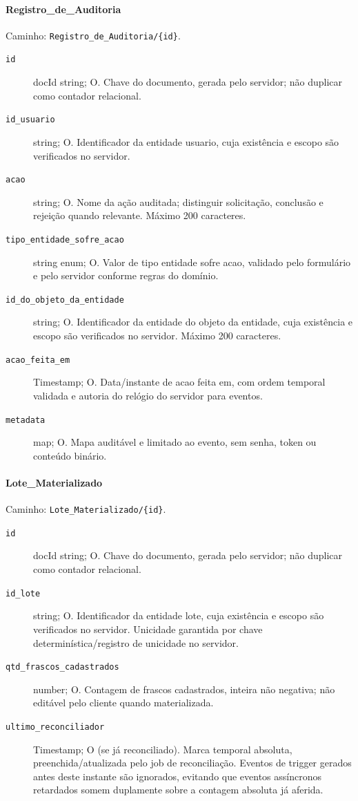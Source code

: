 \paragraph{Registro\_de\_Auditoria}\mbox{}\par
Caminho: \texttt{Registro\_de\_Auditoria/\{id\}}.
\begin{description}
\item[\texttt{id}] docId string; O. Chave do documento, gerada pelo servidor; não duplicar como contador relacional.
\item[\texttt{id\_usuario}] string; O. Identificador da entidade usuario, cuja existência e escopo são verificados no servidor.
\item[\texttt{acao}] string; O. Nome da ação auditada; distinguir solicitação, conclusão e rejeição quando relevante. Máximo 200 caracteres.
\item[\texttt{tipo\_entidade\_sofre\_acao}] string enum; O. Valor de tipo entidade sofre acao, validado pelo formulário e pelo servidor conforme regras do domínio.
\item[\texttt{id\_do\_objeto\_da\_entidade}] string; O. Identificador da entidade do objeto da entidade, cuja existência e escopo são verificados no servidor. Máximo 200 caracteres.
\item[\texttt{acao\_feita\_em}] Timestamp; O. Data/instante de acao feita em, com ordem temporal validada e autoria do relógio do servidor para eventos.
\item[\texttt{metadata}] map; O. Mapa auditável e limitado ao evento, sem senha, token ou conteúdo binário.
\end{description}

\paragraph{Lote\_Materializado}\mbox{}\par
Caminho: \texttt{Lote\_Materializado/\{id\}}.
\begin{description}
\item[\texttt{id}] docId string; O. Chave do documento, gerada pelo servidor; não duplicar como contador relacional.
\item[\texttt{id\_lote}] string; O. Identificador da entidade lote, cuja existência e escopo são verificados no servidor. Unicidade garantida por chave determinística/registro de unicidade no servidor.
\item[\texttt{qtd\_frascos\_cadastrados}] number; O. Contagem de frascos cadastrados, inteira não negativa; não editável pelo cliente quando materializada.
\item[\texttt{ultimo\_reconciliador}] Timestamp; O (se já reconciliado). Marca temporal absoluta, preenchida/atualizada pelo job de reconciliação. Eventos de trigger gerados antes deste instante são ignorados, evitando que eventos assíncronos retardados somem duplamente sobre a contagem absoluta já aferida.
\end{description}

